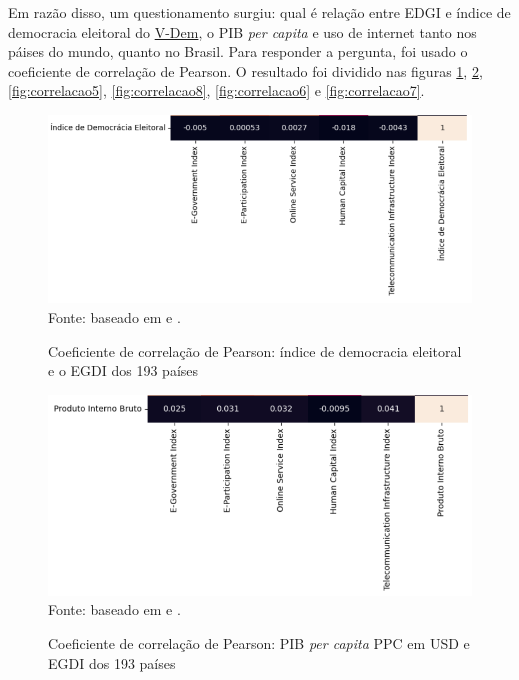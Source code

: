 Em razão disso, um questionamento surgiu: qual é relação entre EDGI e índice de democracia eleitoral do \href{https://www.v-dem.net/}{V-Dem}, o PIB \textit{per capita} e uso de internet tanto nos páises do mundo, quanto no Brasil. Para responder a pergunta, foi usado o coeficiente de correlação de Pearson. O resultado foi dividido nas figuras \ref{fig:correlacao3}, \ref{fig:correlacao4}, \ref{fig:correlacao5}, \ref{fig:correlacao8}, \ref{fig:correlacao6} e \ref{fig:correlacao7}.

\begin{figure}[H]
    \centering
    \caption{Coeficiente de correlação de Pearson: índice de democracia eleitoral e o EGDI dos 193 países}
    \includegraphics[width=1\linewidth]{figuras/egdi/correlacao3.png}
    \label{fig:correlacao3}
    \footnotesize{Fonte: baseado em \cite{ONU_edgi_mapa} e \cite{electoral_democracy_index}.}
\end{figure}

\begin{figure}[H]
    \centering
    \caption{Coeficiente de correlação de Pearson: PIB \textit{per capita} PPC em USD e EGDI dos 193 países}
    \includegraphics[width=1\linewidth]{figuras/egdi/correlacao4.png}
    \label{fig:correlacao4}
    \footnotesize{Fonte: baseado em \cite{ONU_edgi_mapa} e \cite{WB_pib_per_capita_paises}.}
\end{figure}

